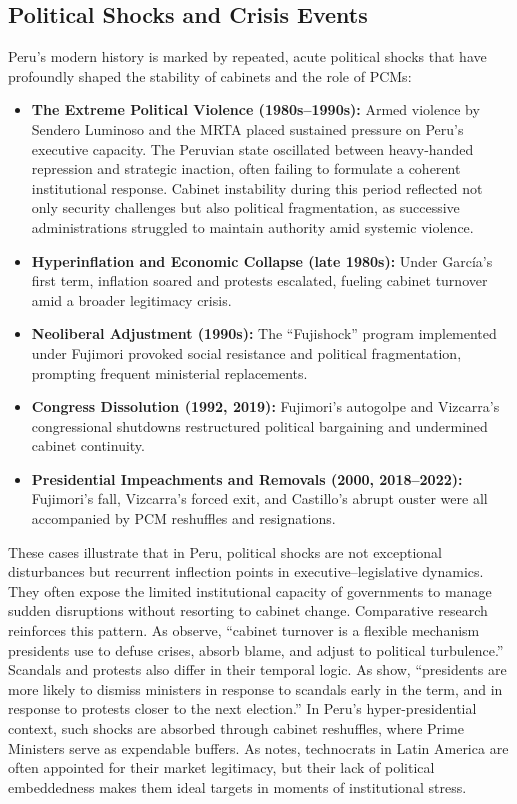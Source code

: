 \documentclass[a4paper, 12pt]{article}
\begin{document}
\subsection{Political Shocks and Crisis Events}

Peru’s modern history is marked by repeated, acute political shocks that have profoundly shaped the stability of cabinets and the role of PCMs:

\begin{itemize}
  \item \textbf{The Extreme Political Violence (1980s–1990s):} Armed violence by Sendero Luminoso and the MRTA placed sustained pressure on Peru’s executive capacity. The Peruvian state oscillated between heavy-handed repression and strategic inaction, often failing to formulate a coherent institutional response. Cabinet instability during this period reflected not only security challenges but also political fragmentation, as successive administrations struggled to maintain authority amid systemic violence.
  \item \textbf{Hyperinflation and Economic Collapse (late 1980s):} Under García’s first term, inflation soared and protests escalated, fueling cabinet turnover amid a broader legitimacy crisis.
  \item \textbf{Neoliberal Adjustment (1990s):} The ``Fujishock'' program implemented under Fujimori provoked social resistance and political fragmentation, prompting frequent ministerial replacements.
  \item \textbf{Congress Dissolution (1992, 2019):} Fujimori's autogolpe and Vizcarra’s congressional shutdowns restructured political bargaining and undermined cabinet continuity.
  \item \textbf{Presidential Impeachments and Removals (2000, 2018–2022):} Fujimori’s fall, Vizcarra’s forced exit, and Castillo’s abrupt ouster were all accompanied by PCM reshuffles and resignations.
\end{itemize}

These cases illustrate that in Peru, political shocks are not exceptional disturbances but recurrent inflection points in executive–legislative dynamics. They often expose the limited institutional capacity of governments to manage sudden disruptions without resorting to cabinet change. Comparative research reinforces this pattern. As \citet[609]{camerlo_minister_2015-1} observe, ``cabinet turnover is a flexible mechanism presidents use to defuse crises, absorb blame, and adjust to political turbulence.'' Scandals and protests also differ in their temporal logic. As \citet[611]{camerlo_minister_2015-1} show, ``presidents are more likely to dismiss ministers in response to scandals early in the term, and in response to protests closer to the next election.'' In Peru’s hyper-presidential context, such shocks are absorbed through cabinet reshuffles, where Prime Ministers serve as expendable buffers. As \citet[7-9]{dargent_technocracy_2014} notes, technocrats in Latin America are often appointed for their market legitimacy, but their lack of political embeddedness makes them ideal targets in moments of institutional stress.
\end{document}
